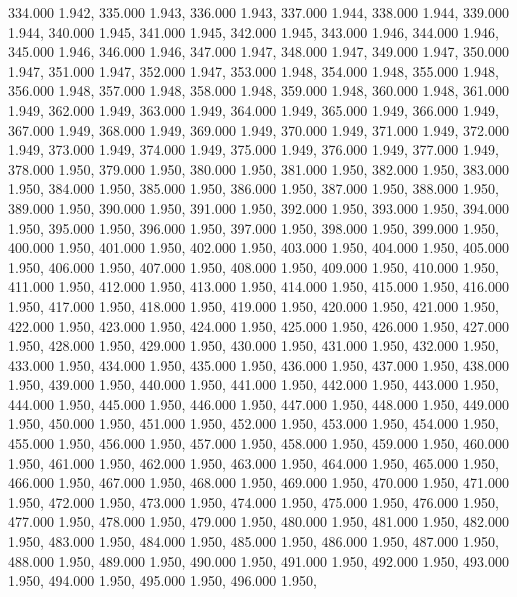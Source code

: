 334.000 1.942, 
335.000 1.943, 
336.000 1.943, 
337.000 1.944, 
338.000 1.944, 
339.000 1.944, 
340.000 1.945, 
341.000 1.945, 
342.000 1.945, 
343.000 1.946, 
344.000 1.946, 
345.000 1.946, 
346.000 1.946, 
347.000 1.947, 
348.000 1.947, 
349.000 1.947, 
350.000 1.947, 
351.000 1.947, 
352.000 1.947, 
353.000 1.948, 
354.000 1.948, 
355.000 1.948, 
356.000 1.948, 
357.000 1.948, 
358.000 1.948, 
359.000 1.948, 
360.000 1.948, 
361.000 1.949, 
362.000 1.949, 
363.000 1.949, 
364.000 1.949, 
365.000 1.949, 
366.000 1.949, 
367.000 1.949, 
368.000 1.949, 
369.000 1.949, 
370.000 1.949, 
371.000 1.949, 
372.000 1.949, 
373.000 1.949, 
374.000 1.949, 
375.000 1.949, 
376.000 1.949, 
377.000 1.949, 
378.000 1.950, 
379.000 1.950, 
380.000 1.950, 
381.000 1.950, 
382.000 1.950, 
383.000 1.950, 
384.000 1.950, 
385.000 1.950, 
386.000 1.950, 
387.000 1.950, 
388.000 1.950, 
389.000 1.950, 
390.000 1.950, 
391.000 1.950, 
392.000 1.950, 
393.000 1.950, 
394.000 1.950, 
395.000 1.950, 
396.000 1.950, 
397.000 1.950, 
398.000 1.950, 
399.000 1.950, 
400.000 1.950, 
401.000 1.950, 
402.000 1.950, 
403.000 1.950, 
404.000 1.950, 
405.000 1.950, 
406.000 1.950, 
407.000 1.950, 
408.000 1.950, 
409.000 1.950, 
410.000 1.950, 
411.000 1.950, 
412.000 1.950, 
413.000 1.950, 
414.000 1.950, 
415.000 1.950, 
416.000 1.950, 
417.000 1.950, 
418.000 1.950, 
419.000 1.950, 
420.000 1.950, 
421.000 1.950, 
422.000 1.950, 
423.000 1.950, 
424.000 1.950, 
425.000 1.950, 
426.000 1.950, 
427.000 1.950, 
428.000 1.950, 
429.000 1.950, 
430.000 1.950, 
431.000 1.950, 
432.000 1.950, 
433.000 1.950, 
434.000 1.950, 
435.000 1.950, 
436.000 1.950, 
437.000 1.950, 
438.000 1.950, 
439.000 1.950, 
440.000 1.950, 
441.000 1.950, 
442.000 1.950, 
443.000 1.950, 
444.000 1.950, 
445.000 1.950, 
446.000 1.950, 
447.000 1.950, 
448.000 1.950, 
449.000 1.950, 
450.000 1.950, 
451.000 1.950, 
452.000 1.950, 
453.000 1.950, 
454.000 1.950, 
455.000 1.950, 
456.000 1.950, 
457.000 1.950, 
458.000 1.950, 
459.000 1.950, 
460.000 1.950, 
461.000 1.950, 
462.000 1.950, 
463.000 1.950, 
464.000 1.950, 
465.000 1.950, 
466.000 1.950, 
467.000 1.950, 
468.000 1.950, 
469.000 1.950, 
470.000 1.950, 
471.000 1.950, 
472.000 1.950, 
473.000 1.950, 
474.000 1.950, 
475.000 1.950, 
476.000 1.950, 
477.000 1.950, 
478.000 1.950, 
479.000 1.950, 
480.000 1.950, 
481.000 1.950, 
482.000 1.950, 
483.000 1.950, 
484.000 1.950, 
485.000 1.950, 
486.000 1.950, 
487.000 1.950, 
488.000 1.950, 
489.000 1.950, 
490.000 1.950, 
491.000 1.950, 
492.000 1.950, 
493.000 1.950, 
494.000 1.950, 
495.000 1.950, 
496.000 1.950, 

